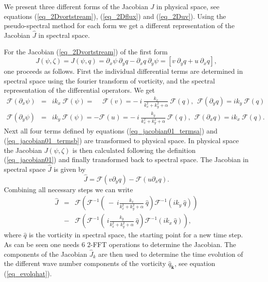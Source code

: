We present three different forms of the Jacobian $J$ in physical space, 
see equations (\ref{eq_2Dvortstream}), (\ref{eq_2Dflux}) 
and (\ref{eq_2Duv}). Using the pseudo-spectral method for each
form we get a different representation of the Jacobian $\hat{J}$ 
in spectral space.   

For the Jacobian (\ref{eq_2Dvortstream}) of the first form
\begin{equation} \label{eq_jacobian01}
  J(\psi,\zeta) 
   = 
  J(\psi,q) 
   = 
  \partial_{x} \psi \ \partial_{y} q 
   -   
  \partial_{x} q \ \partial_{y} \psi
   =
  \left[ v \ \partial_{y} q  + u \ \partial_{x} q \right],
\end{equation}
one proceeds as follows. First the individual differential terms 
are determined in spectral space using the fourier transform of 
vorticity, and the spectral representation of the differential 
operators. We get
\begin{eqnarray} \label{eq_jacobian01_termsa}
  \mathcal{F}(\partial_{x} \psi)
  &=& 
  i  k_{x} \ \mathcal{F}(\psi)
   =
  \phantom{-} \mathcal{F}(v)
   = 
  - \ i \ \frac{k_{x}}{k^{2}_{x} + k^{2}_{y} + \alpha} \ 
  \mathcal{F}(q),
  \ \ 
  \mathcal{F}(\partial_{y} q)
   = 
  i k_{y} \ \mathcal{F}(q) \ \ \
  \\ \label{eq_jacobian01_termsb}
  \mathcal{F}(\partial_{y} \psi)
  &=&
  i  k_{y} \ \mathcal{F}(\psi)
   =
  - \mathcal{F}(u)
   = 
  - \ i \ \frac{k_{y}}{k^{2}_{x} + k^{2}_{y} + \alpha} \ 
  \mathcal{F}(q),
  \ \
  \mathcal{F}(\partial_{x} q)
   = 
  i k_{x} \ \mathcal{F}(q). \ \ \ 
\end{eqnarray}
Next all four terms defined by equations (\ref{eq_jacobian01_termsa}) 
and (\ref{eq_jacobian01_termsb}) are transformed to physical space. 
In physical space the Jacobian $J(\psi,\zeta)$ is then 
calculated following the definition (\ref{eq_jacobian01}) and finally
transformed back to spectral space. The Jacobian in spectral space 
$\hat{J}$ is given by
\begin{equation} \label{eq_jacobian01_J}
  \hat{J} 
   = 
  \mathcal{F}(v \partial_{y} q)
   -
  \mathcal{F}(u \partial_{x} q).
\end{equation}
Combining all necessary steps we can write
\begin{eqnarray} \nonumber
  \hat{J} 
   &=&
  \mathcal{F}
   \left(
    \mathcal{F}^{-1} 
     \left(
      \ - \ i \frac{k_{x}}{k^{2}_{x}+k^{2}_{y}+\alpha} \ 
      \hat{q}
     \right) 
    \mathcal{F}^{-1} 
     \left(
      ik_{y} \ \hat{q}
     \right)
   \right)
    \\ \label{eq_jacobian01_Jall}
   &-&
  \mathcal{F}
   \left(
    \mathcal{F}^{-1} 
     \left(
     \ i \frac{k_{y}}{k^{2}_{x}+k^{2}_{y}+\alpha} \ 
      \hat{q}
     \right) 
    \mathcal{F}^{-1}
     \left(
      ik_{x} \ \hat{q}
     \right)
   \right),
\end{eqnarray}
where $\hat{q}$ is the vorticity in spectral space, the starting point
for a new time step. As can be seen one needs $6$ $2$-FFT operations
to determine the Jacobian. The components of the Jacobian 
$\hat{J}_{k}$ are then used to determine the time 
evolution of the different wave number components of the vorticity 
$\hat{q}_{\mathbf{k}}$, see equation (\ref{eq_evolqhat}). 

